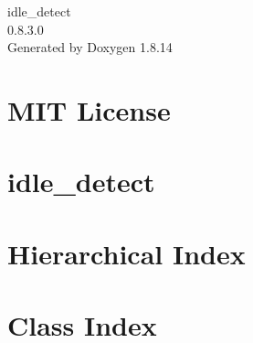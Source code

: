 \documentclass[twoside]{book}
\newcommand{\+}{\discretionary{\mbox{\scriptsize$\hookleftarrow$}}{}{}}
\newcommand{\clearemptydoublepage}{%
  \newpage{\pagestyle{empty}\cleardoublepage}%
}
\begin{document}
\hypersetup{pageanchor=false,
             bookmarksnumbered=true,
             pdfencoding=unicode
            }
\begin{titlepage}
\vspace*{7cm}
\begin{center}%
{\Large idle\+\_\+detect \\[1ex]\large 0.\+8.\+3.\+0 }\\
\vspace*{1cm}
{\large Generated by Doxygen 1.8.14}\\
\end{center}
\end{titlepage}
\clearemptydoublepage
{}
\tableofcontents
\clearemptydoublepage
{}
\hypersetup{pageanchor=true}

\chapter{M\+IT License}
\label{md_LICENSE}

\chapter{idle\+\_\+detect}
\label{md_README}

\chapter{Hierarchical Index}

\chapter{Class Index}

\end{document}
